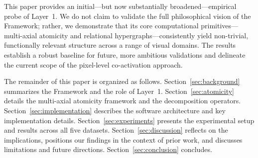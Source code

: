 This paper provides an initial---but now substantially broadened---empirical probe of Layer~1. We do not claim to validate the full philosophical vision of the \Apeiron{} Framework; rather, we demonstrate that its core computational primitives---multi-axial atomicity and relational hypergraphs---consistently yield non-trivial, functionally relevant structure across a range of visual domains. The results establish a robust baseline for future, more ambitious validations and delineate the current scope of the pixel-level co-activation approach.

The remainder of this paper is organized as follows. Section~\ref{sec:background} summarizes the \Apeiron{} Framework and the role of Layer~1. Section~\ref{sec:atomicity} details the multi-axial atomicity framework and the decomposition operators. Section~\ref{sec:implementation} describes the software architecture and key implementation details. Section~\ref{sec:experiments} presents the experimental setup and results across all five datasets. Section~\ref{sec:discussion} reflects on the implications, positions our findings in the context of prior work, and discusses limitations and future directions. Section~\ref{sec:conclusion} concludes.